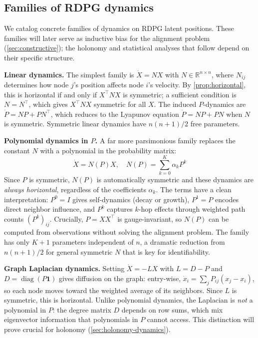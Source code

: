\documentclass{article}
\newcommand{\RR}{\mathbb{R}}
\DeclareMathOperator{\diag}{diag}
\theoremstyle{plain}
\theoremstyle{definition}
\theoremstyle{remark}
\begin{document}
\subsection{Families of RDPG dynamics}\label{sec:dynamics-families}

We catalog concrete families of dynamics on RDPG latent positions.
These families will later serve as inductive bias for the alignment problem (\cref{sec:constructive}); the holonomy and statistical analyses that follow depend on their specific structure.

\textbf{Linear dynamics.}
The simplest family is $\dot{X} = NX$ with $N \in \RR^{n \times n}$, where $N_{ij}$ determines how node $j$'s position affects node $i$'s velocity.
By \cref{prop:horizontal}, this is horizontal if and only if $X^\top NX$ is symmetric; a sufficient condition is $N = N^\top$, which gives $X^\top NX$ symmetric for all $X$.
The induced $P$-dynamics are $\dot{P} = NP + PN^\top$, which reduces to the Lyapunov equation $\dot{P} = NP + PN$ when $N$ is symmetric.
Symmetric linear dynamics have $n(n+1)/2$ free parameters.

\textbf{Polynomial dynamics in $P$.}
A far more parsimonious family replaces the constant $N$ with a polynomial in the probability matrix:
\begin{equation}
\dot{X} = N(P) X, \quad N(P) = \sum_{k=0}^{K} \alpha_k P^k
\end{equation}
Since $P$ is symmetric, $N(P)$ is automatically symmetric and these dynamics are \emph{always horizontal}, regardless of the coefficients $\alpha_k$.
The terms have a clean interpretation: $P^0 = I$ gives self-dynamics (decay or growth), $P^1 = P$ encodes direct neighbor influence, and $P^k$ captures $k$-hop effects through weighted path counts $(P^k)_{ij}$.
Crucially, $P = XX^\top$ is gauge-invariant, so $N(P)$ can be computed from observations without solving the alignment problem.
The family has only $K + 1$ parameters independent of $n$, a dramatic reduction from $n(n+1)/2$ for general symmetric $N$ that is key for identifiability.

\textbf{Graph Laplacian dynamics.}
Setting $\dot{X} = -LX$ with $L = D - P$ and $D = \diag(P\mathbf{1})$ gives diffusion on the graph: entry-wise, $\dot{x}_i = \sum_j P_{ij}(x_j - x_i)$, so each node moves toward the weighted average of its neighbors.
Since $L$ is symmetric, this is horizontal.
Unlike polynomial dynamics, the Laplacian is \emph{not} a polynomial in $P$: the degree matrix $D$ depends on row sums, which mix eigenvector information that polynomials in $P$ cannot access.
This distinction will prove crucial for holonomy (\cref{sec:holonomy-dynamics}).
\end{document}
